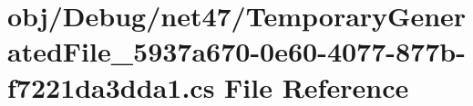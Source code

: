 \hypertarget{net47_2_temporary_generated_file__5937a670-0e60-4077-877b-f7221da3dda1_8cs}{}\section{obj/\+Debug/net47/\+Temporary\+Generated\+File\+\_\+5937a670-\/0e60-\/4077-\/877b-\/f7221da3dda1.cs File Reference}
\label{net47_2_temporary_generated_file__5937a670-0e60-4077-877b-f7221da3dda1_8cs}
